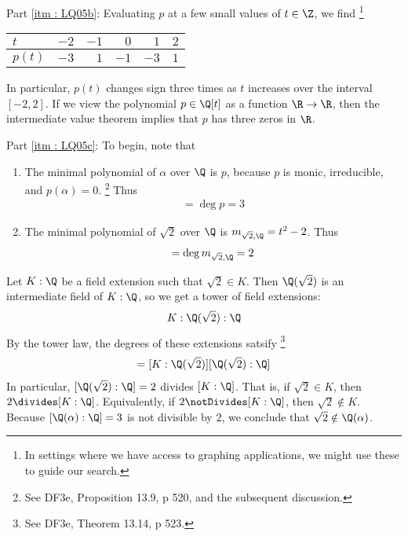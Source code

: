 {Part \ref{itm : LQ05b}: Evaluating $p$ at a few small values of $t \in \Z$, we find%
\footnote{In settings where we have access to graphing applications, we might use these to guide our search.}%
\begin{center}
\begin{tabular}{l|r r r r r}
\hline\hline
$t$		&	$-2$	&	$-1$	&	$0$	&	$1$	&	$2$	\\
\hline
$p(t)$	&	$-3$	&	$1$	&	$-1$	&	$-3$	&	$1$	\\
\hline
\end{tabular}
\end{center}
In particular, $p(t)$ changes sign three times as $t$ increases over the interval $[-2, 2]$. If we view the polynomial $p \in \Q[t]$ as a function $\R \rightarrow \R$, then the intermediate value theorem implies that $p$ has three zeros in $\R$.

Part \ref{itm : LQ05c}: To begin, note that
\begin{enumerate}
\item The minimal polynomial of $\alpha$ over $\Q$ is $p$, because $p$ is monic, irreducible, and $p(\alpha) = 0$.%
\footnote{See DF3e, Proposition 13.9, p 520, and the subsequent discussion.} %
Thus
\begin{align*}
[\Q(\alpha) : \Q]
=
\deg p
=
3
\end{align*}
\item The minimal polynomial of $\sqrt{2}$ over $\Q$ is $m_{\sqrt{2}, \Q} = t^{2} - 2$. Thus
\begin{align*}
[\Q(\sqrt{2}) : \Q]
=
\deg m_{\sqrt{2}, \Q}
=
2
\end{align*}
\end{enumerate}
Let $K : \Q$ be a field extension such that $\sqrt{2} \in K$. Then $\Q(\sqrt{2})$ is an intermediate field of $K : \Q$, so we get a tower of field extensions:
\begin{align*}
K : \Q(\sqrt{2}) : \Q
\end{align*}
By the tower law, the degrees of these extensions satsify%
\footnote{See DF3e, Theorem 13.14, p 523.}%
\begin{align*}
[K : \Q]
=
[K : \Q(\sqrt{2})] [\Q(\sqrt{2}) : \Q]
\end{align*}
In particular, $[\Q(\sqrt{2}) : \Q] = 2$ divides $[K : \Q]$. That is, if $\sqrt{2} \in K$, then $2 \divides [K : \Q]$. Equivalently, if $2 \notDivides [K : \Q]$, then $\sqrt{2} \notin K$. Because $[\Q(\alpha) : \Q] = 3$ is not divisible by $2$, we conclude that $\sqrt{2} \notin \Q(\alpha)$.}%
